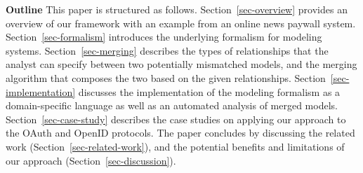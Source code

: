 \textbf{Outline} This paper is structured as
follows. Section~\ref{sec-overview} provides an overview of our
framework with an example from an online news paywall system.
Section~\ref{sec-formalism} introduces the underlying formalism for
modeling systems. Section~\ref{sec-merging} describes the types of
relationships that the analyst can specify between two potentially
mismatched models, and the merging algorithm that composes the two
based on the given relationships. Section~\ref{sec-implementation}
discusses the implementation of the modeling formalism as a
domain-specific language as well as an automated analysis of merged
models. Section~\ref{sec-case-study} describes the case studies on
applying our approach to the OAuth and OpenID protocols. The paper
concludes by discussing the related work
(Section~\ref{sec-related-work}), and the potential benefits and
limitations of our approach (Section~\ref{sec-discussion}).

